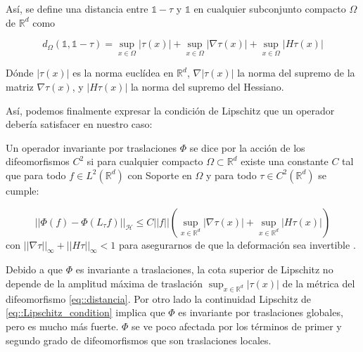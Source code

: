 \begin{definicion}
Así, se define una distancia entre $\mathbb{1}-\tau$ y $\mathbb{1}$ en cualquier subconjunto compacto $\Omega$ de $\mathbb{R}^d$ como 

\begin{equation} \label{eq::distancia}
  d_\Omega(\mathbb{1},\mathbb{1}-\tau) = \sup_{x \in \Omega} |\tau (x)| + \sup_{x \in \Omega} |\nabla \tau (x)| + \sup_{x \in \Omega}|H \tau (x)|
\end{equation}

\end{definicion}
\medskip

\noindent Dónde $|\tau (x)|$ es la norma euclídea en $\mathbb{R}^d$, $\nabla |\tau (x)|$ la norma del supremo de la matriz $\nabla \tau (x)$, y $|H \tau (x)|$ la norma del supremo del Hessiano.

\medskip

\noindent Así, podemos finalmente expresar la condición de Lipschitz que un operador debería satisfacer en nuestro caso:  

\medskip

\begin{definicion} \label{def::Lipschitz_cont}
\noindent Un operador invariante por traslaciones $\Phi$ se dice  por la acción de los difeomorfismos $C^2$  si para cualquier compacto $\Omega \subset \mathbb{R}^d$ existe una constante $C$ tal que para todo $f \in L^2(\mathbb{R}^d)$ con Soporte en $\Omega$ y para todo $\tau \in C^2(\mathbb{R}^d)$ se cumple:

\begin{equation} \label{eq::Lipschitz_condition}
  || \Phi(f)-\Phi(L_{\tau}f)||_\mathcal{H} \leq C||f||(\sup_{x \in \mathbb{R}^d} |\nabla \tau (x)| + \sup_{x \in \mathbb{R}^d}|H \tau (x)|)
\end{equation}
con  $|| \nabla \tau ||_\infty + ||H \tau ||_\infty < 1$ para asegurarnos de que la deformación sea invertible \cite{doi:10.1137/S0036141002404838}.
\end{definicion}

\medskip

\noindent Debido a que $\Phi$ es invariante a traslaciones, la cota superior de Lipschitz no depende de la amplitud máxima de traslación $\sup_{x \in \mathbb{R}^d}|\tau (x)|$ de la métrica del difeomorfismo \eqref{eq::distancia}. Por otro lado la continuidad Lipschitz de \eqref{eq::Lipschitz_condition} implica que $\Phi$ es invariante por traslaciones globales, pero es mucho más fuerte. $\Phi$ se ve poco afectada por los términos de primer y segundo grado de difeomorfismos que son traslaciones locales.

